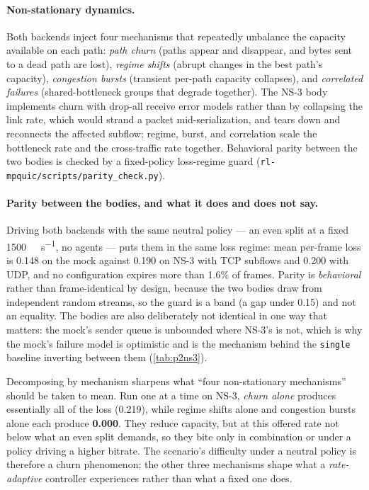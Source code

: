 \paragraph{Non-stationary dynamics.} Both backends inject four mechanisms that repeatedly unbalance the
capacity available on each path: \emph{path churn} (paths appear and disappear, and bytes sent to a dead
path are lost), \emph{regime shifts} (abrupt changes in the best path's capacity), \emph{congestion bursts}
(transient per-path capacity collapses), and \emph{correlated failures} (shared-bottleneck groups that
degrade together). The NS-3 body implements churn with drop-all receive error models rather than by
collapsing the link rate, which would strand a packet mid-serialization, and tears down and reconnects
the affected subflow; regime, burst, and correlation scale the bottleneck rate and the cross-traffic
rate together. Behavioral parity between the two bodies is checked by a fixed-policy loss-regime guard
(\texttt{rl-mpquic/scripts/parity\_check.py}).

\paragraph{Parity between the bodies, and what it does and does not say.} Driving both backends with the
same neutral policy --- an even split at a fixed \SI{1500}{\kilo\bit\per\second}, no agents --- puts them
in the same loss regime: mean per-frame loss is 0.148 on the mock against 0.190 on NS-3 with TCP
subflows and 0.200 with UDP, and no configuration expires more than 1.6\% of frames. Parity is
\emph{behavioral} rather than frame-identical by design, because the two bodies draw from independent
random streams, so the guard is a band (a gap under 0.15) and not an equality. The bodies are also
deliberately not identical in one way that matters: the mock's sender queue is unbounded where NS-3's is
not, which is why the mock's failure model is optimistic and is the mechanism behind the \texttt{single}
baseline inverting between them (\cref{tab:p2ns3}).

Decomposing by mechanism sharpens what ``four non-stationary mechanisms'' should be taken to mean. Run
one at a time on NS-3, \emph{churn alone} produces essentially all of the loss (0.219), while regime
shifts alone and congestion bursts alone each produce \textbf{0.000}. They reduce capacity, but at this
offered rate not below what an even split demands, so they bite only in combination or under a policy
driving a higher bitrate. The scenario's difficulty under a neutral policy is therefore a churn
phenomenon; the other three mechanisms shape what a \emph{rate-adaptive} controller experiences rather
than what a fixed one does.

